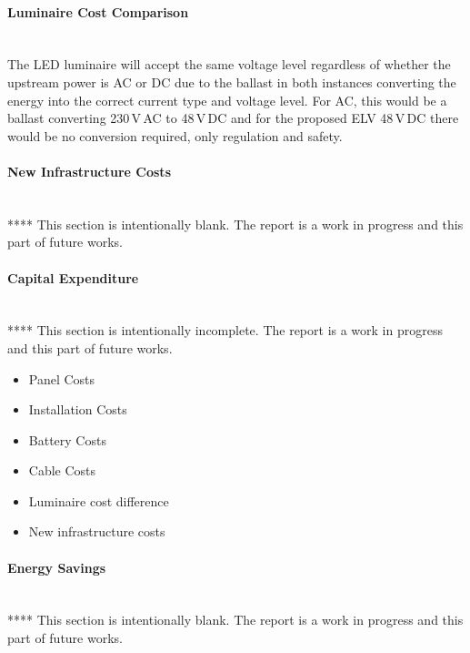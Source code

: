 \paragraph{Luminaire Cost Comparison}
~\\

The LED luminaire will accept the same voltage level regardless of whether the upstream power is AC or DC due to the ballast in both instances converting the energy into the correct current type and voltage level. For AC, this would be a ballast converting 230\,V\,AC to 48\,V\,DC and for the proposed ELV 48\,V\,DC there would be no conversion required, only regulation and safety. 
\newline

  

\paragraph{New Infrastructure Costs}
~\\
****
\newline
This section is intentionally blank. The report is a work in progress and this part of future works.  

\paragraph{Capital Expenditure}
~\\
****
\newline
This section is intentionally incomplete. The report is a work in progress and this part of future works.  

\begin{itemize}[noitemsep,nolistsep]
	\item Panel Costs
	\item Installation Costs
	\item Battery Costs
	\item Cable Costs
	\item Luminaire cost difference
	\item New infrastructure costs
\end{itemize}

\paragraph{Energy Savings}
~\\
****
\newline
This section is intentionally blank. The report is a work in progress and this part of future works.  

